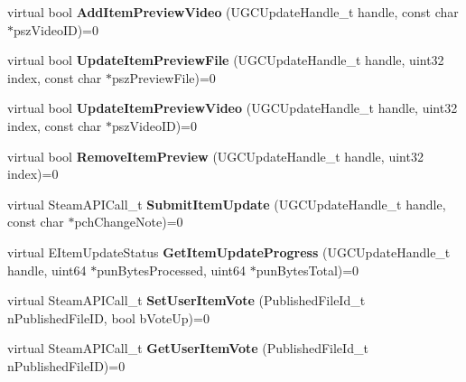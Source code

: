 \begin{DoxyCompactItemize}
\item 
\mbox{\label{class_i_steam_u_g_c_a160e066d0d8b39e34cda4fa1838b370f}} 
virtual bool {\bfseries Add\+Item\+Preview\+Video} (U\+G\+C\+Update\+Handle\+\_\+t handle, const char $\ast$psz\+Video\+ID)=0
\item 
\mbox{\label{class_i_steam_u_g_c_a7a4cc8c5c54d066a2212af26cf32841b}} 
virtual bool {\bfseries Update\+Item\+Preview\+File} (U\+G\+C\+Update\+Handle\+\_\+t handle, uint32 index, const char $\ast$psz\+Preview\+File)=0
\item 
\mbox{\label{class_i_steam_u_g_c_a69e786ba9b6c52776263610c0dab1b4b}} 
virtual bool {\bfseries Update\+Item\+Preview\+Video} (U\+G\+C\+Update\+Handle\+\_\+t handle, uint32 index, const char $\ast$psz\+Video\+ID)=0
\item 
\mbox{\label{class_i_steam_u_g_c_a1fd6fb8bd8f2c73544913703da84bd86}} 
virtual bool {\bfseries Remove\+Item\+Preview} (U\+G\+C\+Update\+Handle\+\_\+t handle, uint32 index)=0
\item 
\mbox{\label{class_i_steam_u_g_c_af7949cf8d026feae9345c54a90aeaaa8}} 
virtual Steam\+A\+P\+I\+Call\+\_\+t {\bfseries Submit\+Item\+Update} (U\+G\+C\+Update\+Handle\+\_\+t handle, const char $\ast$pch\+Change\+Note)=0
\item 
\mbox{\label{class_i_steam_u_g_c_ac422eb210329fc081c0f8d440f26ac96}} 
virtual E\+Item\+Update\+Status {\bfseries Get\+Item\+Update\+Progress} (U\+G\+C\+Update\+Handle\+\_\+t handle, uint64 $\ast$pun\+Bytes\+Processed, uint64 $\ast$pun\+Bytes\+Total)=0
\item 
\mbox{\label{class_i_steam_u_g_c_a3533f018be34c76fc0163b286b904ce0}} 
virtual Steam\+A\+P\+I\+Call\+\_\+t {\bfseries Set\+User\+Item\+Vote} (Published\+File\+Id\+\_\+t n\+Published\+File\+ID, bool b\+Vote\+Up)=0
\item 
\mbox{\label{class_i_steam_u_g_c_a6621517b2fe7a1b95744209c6e39203f}} 
virtual Steam\+A\+P\+I\+Call\+\_\+t {\bfseries Get\+User\+Item\+Vote} (Published\+File\+Id\+\_\+t n\+Published\+File\+ID)=0
\item 

\end{DoxyCompactItemize}
